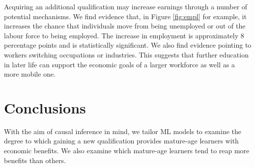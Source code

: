 \documentclass[12pt, a4paper]{article}
\begin{document}
%
%

Acquiring an additional qualification may increase earnings through a number of potential mechanisms. We find evidence that, in Figure \ref{fig:empl} for example, it increases the chance that individuals move from being unemployed or out of the labour force to being employed. The increase in employment is approximately 8 percentage points and is statistically significant. We also find evidence pointing to workers switching occupations or industries. This suggests that further education in later life can support the economic goals of a larger workforce as well as a more mobile one.


\section{Conclusions}


With the aim of causal inference in mind, we tailor ML models to examine the degree to which gaining a new qualification provides mature-age learners with economic benefits. We also examine which mature-age learners tend to reap more benefits than others.
\end{document}
